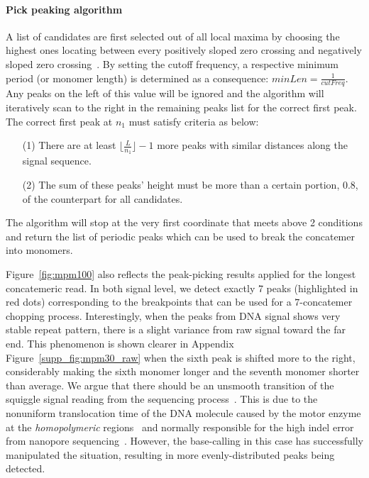 \paragraph{Pick peaking algorithm}
A list of candidates are first selected out of all local maxima by choosing the highest ones locating between every positively sloped zero crossing and negatively sloped zero crossing~\cite{Mcleod2005tartini}.
By setting the cutoff frequency, a respective minimum period (or monomer length) is determined as a consequence: $minLen=\frac{\displaystyle 1}{\displaystyle cutFreq}$. 
Any peaks on the left of this value will be ignored and the algorithm will iteratively scan to the right in the remaining peaks list for the correct first peak.
The correct first peak at $n_1$ must satisfy criteria as below:
\begin{itemize}
    \item[(1)] There are at least $\lfloor \frac{\displaystyle L}{\displaystyle n_1} \rfloor - 1$ more peaks with similar distances along the signal sequence.
    \item[(2)] The sum of these peaks' height must be more than a certain portion, \EG{} $0.8$, of the counterpart for all candidates.
\end{itemize}
The algorithm will stop at the very first coordinate that meets above 2 conditions and return the list of periodic peaks which can be used to break the concatemer into monomers. 

Figure~\ref{fig:mpm100} also reflects the peak-picking results applied for the longest concatemeric read. 
In both signal level, we detect exactly 7 peaks (highlighted in red dots) corresponding to the breakpoints that can be used for a $7$-concatemer chopping process.
Interestingly, when the peaks from DNA signal shows very stable repeat pattern, there is a slight variance from raw signal toward the far end. 
This phenomenon is shown clearer in Appendix Figure~\ref{supp_fig:mpm30_raw} when the sixth peak is shifted more to the right, considerably making the sixth monomer longer and the seventh monomer shorter than average.
We argue that there should be an unsmooth transition of the squiggle signal reading from the sequencing process~\cite{Rang2018squiggle}.
This is due to the nonuniform translocation time of the DNA molecule caused by the motor enzyme at the \emph{homopolymeric} regions~\cite{Manrao2012reading,Cherf2012automated,Sarkozy2017calling} and normally responsible for the high indel error from nanopore sequencing~\cite{Jain2018nanopore3,Stancu2017nanopore5,Ip2015minion}.
However, the base-calling in this case has successfully manipulated the situation, resulting in more evenly-distributed peaks being detected.

